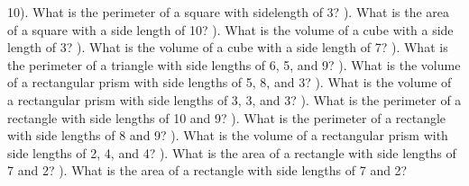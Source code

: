 \documentclass{article}%
\begin{document}
10). What is the perimeter of a square with sidelength of 3?%
\newline%
\newline%
). What is the area of a square with a side length of 10?%
\newline%
\newline%
). What is the volume of a cube with a side length of 3?%
\newline%
\newline%
). What is the volume of a cube with a side length of 7?%
\newline%
\newline%
). What is the perimeter of a triangle with side lengths of 6, 5, and 9?%
\newline%
\newline%
). What is the volume of a rectangular prism with side lengths of 5, 8, and 3?%
\newline%
\newline%
). What is the volume of a rectangular prism with side lengths of 3, 3, and 3?%
\newline%
\newline%
). What is the perimeter of a rectangle with side lengths of 10 and 9?%
\newline%
\newline%
). What is the perimeter of a rectangle with side lengths of 8 and 9?%
\newline%
\newline%
). What is the volume of a rectangular prism with side lengths of 2, 4, and 4?%
\newline%
\newline%
). What is the area of a rectangle with side lengths of 7 and 2?%
\newline%
\newline%
). What is the area of a rectangle with side lengths of 7 and 2?%
\newline%
\newline%
\newline%
\end{document}
